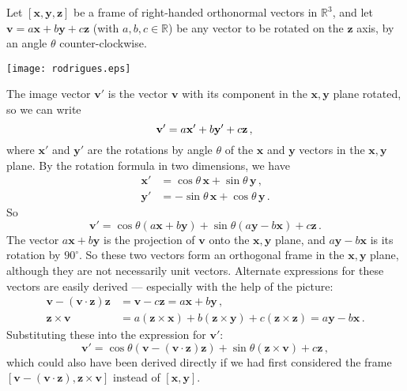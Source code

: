 \documentclass[12pt]{article}
\newcommand{\real}{\mathbb{R}}
\newcommand{\bx}{\mathbf{x}}
\newcommand{\by}{\mathbf{y}}
\newcommand{\bz}{\mathbf{z}}
\newcommand{\bv}{\mathbf{v}}
\begin{document}
Let $[ \bx, \by, \bz]$ be a frame of right-handed orthonormal vectors in $\real^3$,
and let $\bv = a\bx + b\by + c\bz$ (with $a, b, c \in \real$) be any vector to be rotated on the $\bz$ axis,
by an angle $\theta$ counter-clockwise.

\begin{center}
\texttt{[image: rodrigues.eps]}
\end{center}

The image vector $\bv'$ is the vector $\bv$ with its component
in the $\bx,\by$ plane rotated, so we can write
\[
\bv' = a\bx' + b\by' + c\bz\,,\\
\]
where $\bx'$ and $\by'$ are the rotations by angle $\theta$ of the $\bx$ and $\by$ vectors in the $\bx,\by$ plane. By the rotation formula in two dimensions, we have
\begin{align*}
\bx' &= \cos \theta \, \bx + \sin \theta \, \by\,, \\
\by' &= -\sin \theta \, \bx + \cos \theta \, \by\,.
\end{align*}
So
\[
\bv' = \cos \theta (a\bx + b\by) + \sin \theta (a \by - b\bx) + c\bz\,.
\]
The vector $a \bx + b\by$ is the projection of $\bv$
onto the $\bx,\by$ plane, and $a \by - b\bx$ is its rotation by $90^\circ$.
So these two vectors form an orthogonal frame in the $\bx,\by$ plane,
although they are not necessarily unit vectors.
Alternate expressions for these vectors are easily derived --- especially with the help of the picture:
\begin{align*}
\bv - (\bv \cdot \bz) \bz &= \bv - c\bz = a\bx + b\by\,, \\
\bz \times \bv &= a (\bz\times \bx) + b (\bz \times \by) + c (\bz \times \bz) = a\by - b\bx \,.
\end{align*}
Substituting these into the expression for $\bv'$:
\[
\bv' = \cos \theta (\bv - (\bv \cdot \bz) \bz) + \sin\theta (\bz \times \bv) + c\bz\,,
\]
which could also have been derived directly 
if we had first considered the frame $[\bv - (\bv \cdot \bz), \bz \times \bv]$ instead of $[\bx, \by]$.
\end{document}
